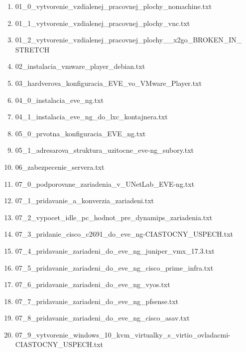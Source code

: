 \begin{enumerate}[noitemsep,label*=\thesection.\arabic*.]
\begin{enumerate}[noitemsep,label*=\arabic*.]
        \item \label{item:vnc1} 01\_0\_vytvorenie\_vzdialenej\_pracovnej\_plochy\_nomachine.txt
        \item \label{item:vnc2} 01\_1\_vytvorenie\_vzdialenej\_pracovnej\_plochy\_vnc.txt
        \item \label{item:vnc3} 01\_2\_vytvorenie\_vzdialenej\_pracovnej\_plochy\_\_x2go\_BROKEN\_IN\_\\STRETCH
        \item \label{item:vmware_extra_instalacia} 02\_instalacia\_vmware\_player\_debian.txt
        \item 03\_hardverova\_konfiguracia\_EVE\_vo\_VMware\_Player.txt
        \item \label{item:instalacia_ubuntu_a_eve_ng} 04\_0\_instalacia\_eve\_ng.txt
        \item 04\_1\_instalacia\_eve\_ng\_do\_lxc\_kontajnera.txt
        \item \label{item:instalacia_A_konfiguracia_eve_ng} 05\_0\_prvotna\_konfiguracia\_EVE\_ng.txt
        \item \label{item:adresarova_struktura} 05\_1\_adresarova\_struktura\_uzitocne\_eve-ng\_subory.txt
        \item \label{item:zabezpecenie} 06\_zabezpecenie\_servera.txt
        \item 07\_0\_podporovane\_zariadenia\_v\_UNetLab\_EVE-ng.txt
        \item \label{item:pridavanie_konverzia_zariadeni} 07\_1\_pridavanie\_a\_konverzia\_zariadeni.txt
        \item 07\_2\_vypocet\_idle\_pc\_hodnot\_pre\_dynamips\_zariadenia.txt
        \item 07\_3\_pridanie\_cisco\_c2691\_do\_eve\_ng-CIASTOCNY\_USPECH.txt
        \item \label{item:pridavanie_juniper_vmx} 07\_4\_pridavanie\_zariadeni\_do\_eve\_ng\_juniper\_vmx\_17.3.txt
        \item 07\_5\_pridavanie\_zariadeni\_do\_eve\_ng\_cisco\_prime\_infra.txt
        \item 07\_6\_pridavanie\_zariadeni\_do\_eve\_ng\_vyos.txt
        \item 07\_7\_pridavanie\_zariadeni\_do\_eve\_ng\_pfsense.txt
        \item \label{item:pridavanie_cisco_asav} 07\_8\_pridavanie\_zariadeni\_do\_eve\_ng\_cisco\_asav.txt
        \item \label{item:pridavanie_win} 07\_9\_vytvorenie\_windows\_10\_kvm\_virtualky\_s\_virtio\_ovladacmi-\\CIASTOCNY\_USPECH.txt

\end{enumerate}
\end{enumerate}
